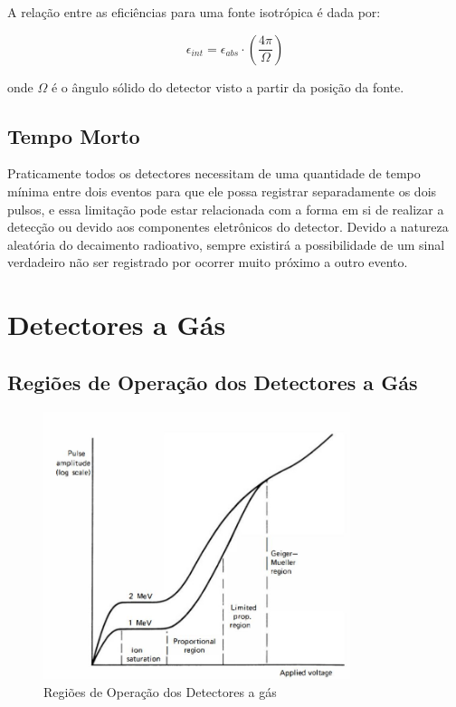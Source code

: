 \documentclass[11pt,a4paper]{article}
\begin{document}
		A relação entre as eficiências para uma fonte isotrópica é dada por:

			\begin{equation}
					\epsilon_{int} = \epsilon_{abs} \cdot \left(\frac{4 \pi}{\Omega}\right)
			\end{equation}

		\noindent onde $\Omega$ é o ângulo sólido do detector visto a partir da posição da fonte.

	\subsection{Tempo Morto}

		Praticamente todos os detectores necessitam de uma quantidade de tempo mínima entre dois eventos para que ele possa registrar separadamente os dois pulsos, e essa limitação pode estar relacionada com a forma em si de realizar a detecção ou devido aos componentes eletrônicos do detector. Devido a natureza aleatória do decaimento radioativo, sempre existirá a possibilidade de um sinal verdadeiro não ser registrado por ocorrer muito próximo a outro evento. 
\pagebreak
	\section{Detectores a Gás}

	\subsection{Regiões de Operação dos Detectores a Gás}

	\begin{figure}[h]
		\centering
		\includegraphics[width=0.8\textwidth]{Imagens/graficoDetectoresAGas.JPG}
		\caption{Regiões de Operação dos Detectores a gás}
		\label{fig:graficoDetectoresAGas}
	\end{figure}
		
\end{document}

